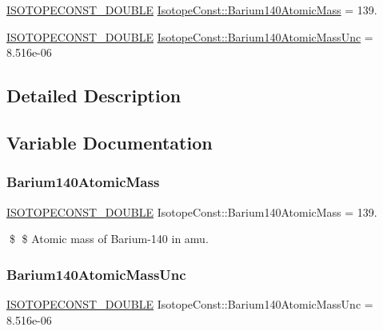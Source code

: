 \begin{DoxyCompactItemize}
\item 
\mbox{\hyperlink{group___isotope_const-_macros_ga8f45a7272ce02c0b4c65c44636ed719a}{I\+S\+O\+T\+O\+P\+E\+C\+O\+N\+S\+T\+\_\+\+D\+O\+U\+B\+LE}} \mbox{\hyperlink{group___isotope_const-_barium-_ba140_ga9f7fc432e2557136d126cb0213c62877}{Isotope\+Const\+::\+Barium140\+Atomic\+Mass}} = 139.
\item 
\mbox{\hyperlink{group___isotope_const-_macros_ga8f45a7272ce02c0b4c65c44636ed719a}{I\+S\+O\+T\+O\+P\+E\+C\+O\+N\+S\+T\+\_\+\+D\+O\+U\+B\+LE}} \mbox{\hyperlink{group___isotope_const-_barium-_ba140_ga8d6b77c36f0c16388e2a8b74a4e2d76d}{Isotope\+Const\+::\+Barium140\+Atomic\+Mass\+Unc}} = 8.\+516e-\/06
\end{DoxyCompactItemize}


\subsection{Detailed Description}


\subsection{Variable Documentation}
\mbox{\label{group___isotope_const-_barium-_ba140_ga9f7fc432e2557136d126cb0213c62877}} 
\subsubsection{\texorpdfstring{Barium140\+Atomic\+Mass}{Barium140AtomicMass}}
{\footnotesize\ttfamily \mbox{\hyperlink{group___isotope_const-_macros_ga8f45a7272ce02c0b4c65c44636ed719a}{I\+S\+O\+T\+O\+P\+E\+C\+O\+N\+S\+T\+\_\+\+D\+O\+U\+B\+LE}} Isotope\+Const\+::\+Barium140\+Atomic\+Mass = 139.}

\$ \$ Atomic mass of Barium-\/140 in amu. \mbox{\label{group___isotope_const-_barium-_ba140_ga8d6b77c36f0c16388e2a8b74a4e2d76d}} 
\subsubsection{\texorpdfstring{Barium140\+Atomic\+Mass\+Unc}{Barium140AtomicMassUnc}}
{\footnotesize\ttfamily \mbox{\hyperlink{group___isotope_const-_macros_ga8f45a7272ce02c0b4c65c44636ed719a}{I\+S\+O\+T\+O\+P\+E\+C\+O\+N\+S\+T\+\_\+\+D\+O\+U\+B\+LE}} Isotope\+Const\+::\+Barium140\+Atomic\+Mass\+Unc = 8.\+516e-\/06}


